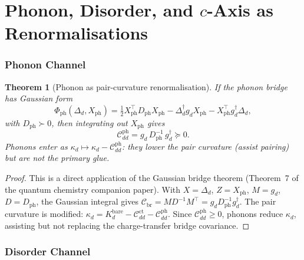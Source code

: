 \documentclass[12pt]{article}
\theoremstyle{plain}
\newtheorem{theorem}{Theorem}[section]
\theoremstyle{definition}
\numberwithin{equation}{section}
\newcommand{\br}{\mathrm{br}}
\begin{document}
\part{Phonon, Disorder, and $c$-Axis as Renormalisations}

\section{Phonon Channel}\label{sec:phonon}

\begin{theorem}[Phonon as pair-curvature renormalisation]\label{thm:phonon}
If the phonon bridge has Gaussian form
\begin{equation}\label{eq:phbridge}
\Phi_{\mathrm{ph}}(\Delta_d,X_{\mathrm{ph}})
= \tfrac{1}{2}X_{\mathrm{ph}}^\top D_{\mathrm{ph}}X_{\mathrm{ph}}
- \Delta_d^\dagger g_d X_{\mathrm{ph}}
- X_{\mathrm{ph}}^\top g_d^\dagger\Delta_d,
\end{equation}
with $D_{\mathrm{ph}}\succ 0$, then integrating out
$X_{\mathrm{ph}}$ gives
\begin{equation}\label{eq:Cph}
\boxed{\mathcal{C}_{dd}^{\mathrm{ph}}
= g_d\,D_{\mathrm{ph}}^{-1}\,g_d^\dagger \succeq 0.}
\end{equation}
Phonons enter as
$\kappa_d\mapsto\kappa_d-\mathcal{C}_{dd}^{\mathrm{ph}}$:
they lower the pair curvature (assist pairing) but are not the
primary glue.
\end{theorem}

\begin{proof}
This is a direct application of the Gaussian bridge theorem
(Theorem~7 of the quantum chemistry companion paper).
With $X=\Delta_d$, $Z=X_{\mathrm{ph}}$, $M=g_d$,
$D=D_{\mathrm{ph}}$, the Gaussian integral gives
$\mathcal{C}_{\br}=MD^{-1}M^\top=g_dD_{\mathrm{ph}}^{-1}g_d^\dagger$.
The pair curvature is modified:
$\kappa_d=K_d^{\mathrm{bare}}-\mathcal{C}_{dd}^{\mathrm{ct}}
-\mathcal{C}_{dd}^{\mathrm{ph}}$.
Since $\mathcal{C}_{dd}^{\mathrm{ph}}\geq 0$, phonons reduce
$\kappa_d$, assisting but not replacing the charge-transfer bridge
covariance.
\end{proof}


\section{Disorder Channel}\label{sec:disorder}
\end{document}

